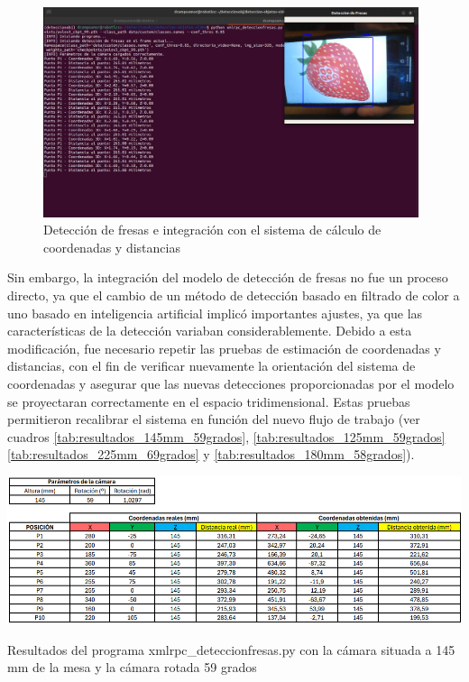   \begin{figure}[H]
    \centering
    \begin{center}
      \includegraphics[width=110mm]{figs/Pruebas deteccion fresas y obtencion coordenadas varios codigos.png}
    \end{center}
    \caption{Detección de fresas e integración con el sistema de cálculo de coordenadas y distancias}
    \label{fig:union_scripts_fresas}
  \end{figure}

Sin embargo, la integración del modelo de detección de fresas no fue un proceso directo, ya que el cambio de un método de detección basado en filtrado de color a uno basado en inteligencia artificial implicó importantes ajustes, ya que las características de la detección variaban considerablemente. Debido a esta modificación, fue necesario repetir las pruebas de estimación de coordenadas y distancias, con el fin de verificar nuevamente la orientación del sistema de coordenadas y asegurar que las nuevas detecciones proporcionadas por el modelo se proyectaran correctamente en el espacio tridimensional. Estas pruebas permitieron recalibrar el sistema en función del nuevo flujo de trabajo (ver cuadros \ref{tab:resultados_145mm_59grados}, \ref{tab:resultados_125mm_59grados} \ref{tab:resultados_225mm_69grados} y \ref{tab:resultados_180mm_58grados}).

   \begin{table}[H]
     \centering
     \begin{center}
       \includegraphics[width=155mm]{figs/Resultados 145 mm 59 grados.png}
     \end{center}
     \caption{Resultados del programa xmlrpc\_deteccionfresas.py con la cámara situada a 145 mm de la mesa y la cámara rotada 59 grados}
     \label{tab:resultados_145mm_59grados}
  \end{table}
  
